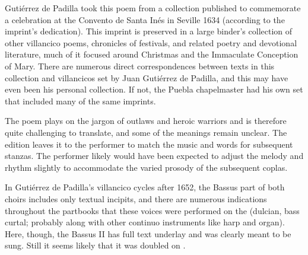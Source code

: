 \begin{notesources}
    \begin{source}
    \end{source}
    \begin{source}
    \end{source}
\end{notesources}

Gutiérrez de Padilla took this poem from a collection published to commemorate
a celebration at the Convento de Santa Inés in Seville 1634 (according to the
imprint's dedication). 
This imprint is preserved in a large binder's collection of other villancico
poems, chronicles of festivals, and related poetry and devotional literature,
much of it focused around Christmas and the Immaculate Conception of Mary.
There are numerous direct correspondences between texts in this collection and
villancicos set by Juan Gutiérrez de Padilla, and this may have even been his
personal collection.
If not, the Puebla chapelmaster had his own set that included many of the same
imprints.

The poem plays on the jargon of outlaws and heroic warriors and is therefore
quite challenging to translate, and some of the meanings remain unclear.
The edition leaves it to the performer to match the music and words for
subsequent stanzas. 
The performer likely would have been expected to adjust the melody and rhythm
slightly to accommodate the varied prosody of the subsequent coplas.

In Gutiérrez de Padilla's villancico cycles after 1652, the Bassus part of
both choirs includes only textual incipits, and there are numerous indications
throughout the partbooks that these voices were performed on the 
(dulcian, bass curtal; probably along with other continuo instruments like
harp and organ).
Here, though, the Bassus II has full text underlay and was clearly meant to be
sung.
Still it seems likely that it was doubled on .


\endinput

